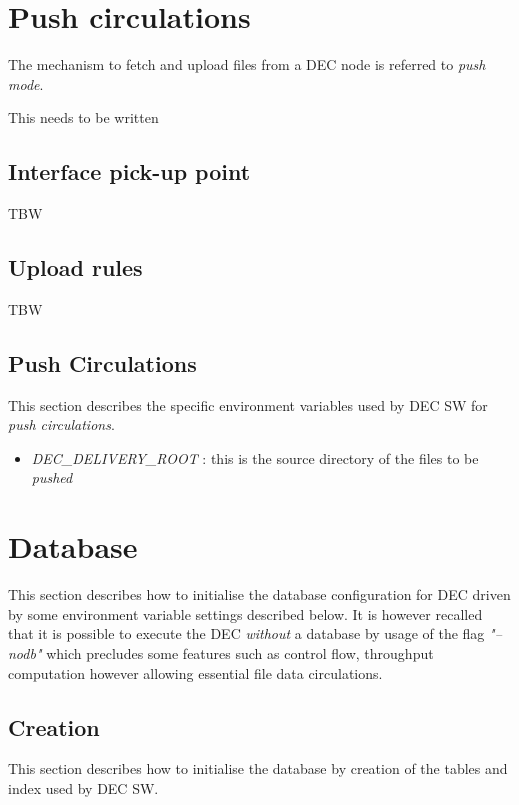 \documentclass[dec_sum_main.tex]{subfiles}
\begin{document}
	
\section{Push circulations}

The mechanism to fetch and upload files from a DEC node is referred to \textit{push mode}.

This needs to be written

\subsection{Interface pick-up point}
TBW

\label{Upload Rules}
\subsection{Upload rules}
TBW



\subsection{Push Circulations}
This section describes the specific environment variables used by DEC SW for \textit{push circulations}.
\begin{itemize}
	\item \textit{DEC\_DELIVERY\_ROOT} : this is the source directory of the files to be \textit{pushed} 
\end{itemize}

\section{Database}
This section describes how to initialise the database configuration for DEC driven by some environment variable settings described below. It is however recalled that it is possible to execute the DEC \textit{without} a database by usage of the flag \textit{"--nodb"} which precludes some features such as control flow, throughput computation however allowing essential file data circulations.


\subsection{Creation}

This section describes how to initialise the database by creation of the tables and index used by DEC SW.
\end{document}
